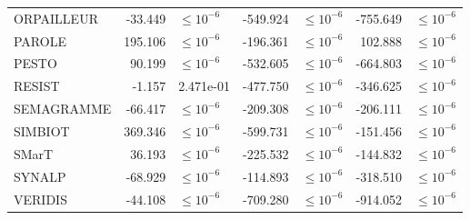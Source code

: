 \begin{tabular}{lrlrlrl}
ORPAILLEUR  &               -33.449 &  $\leq 10^{-6}$ &              -549.924 &  $\leq 10^{-6}$ &              -755.649 &  $\leq 10^{-6}$ \\
PAROLE      &               195.106 &  $\leq 10^{-6}$ &              -196.361 &  $\leq 10^{-6}$ &               102.888 &  $\leq 10^{-6}$ \\
PESTO       &                90.199 &  $\leq 10^{-6}$ &              -532.605 &  $\leq 10^{-6}$ &              -664.803 &  $\leq 10^{-6}$ \\
RESIST      &                -1.157 &       2.471e-01 &              -477.750 &  $\leq 10^{-6}$ &              -346.625 &  $\leq 10^{-6}$ \\
SEMAGRAMME  &               -66.417 &  $\leq 10^{-6}$ &              -209.308 &  $\leq 10^{-6}$ &              -206.111 &  $\leq 10^{-6}$ \\
SIMBIOT     &               369.346 &  $\leq 10^{-6}$ &              -599.731 &  $\leq 10^{-6}$ &              -151.456 &  $\leq 10^{-6}$ \\
SMarT       &                36.193 &  $\leq 10^{-6}$ &              -225.532 &  $\leq 10^{-6}$ &              -144.832 &  $\leq 10^{-6}$ \\
SYNALP      &               -68.929 &  $\leq 10^{-6}$ &              -114.893 &  $\leq 10^{-6}$ &              -318.510 &  $\leq 10^{-6}$ \\
VERIDIS     &               -44.108 &  $\leq 10^{-6}$ &              -709.280 &  $\leq 10^{-6}$ &              -914.052 &  $\leq 10^{-6}$ \\
\bottomrule
\end{tabular}
